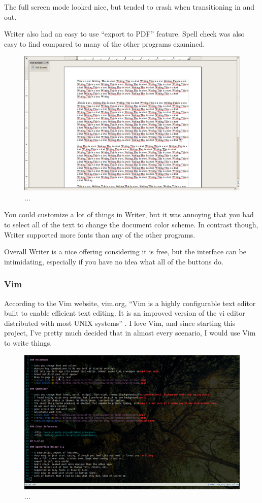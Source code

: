 \documentclass[10pt]{article}
\begin{document}
The full screen mode looked nice, but tended to crash when transitioning in and out.

Writer also had an easy to use ``export to PDF'' feature. Spell check was also easy to find compared to many of the other programs examined.

\begin{figure}
   \centering
      \includegraphics[width=130mm]{images/oo3.png}
   \caption{...}
\end{figure}

You could customize a lot of things in Writer, but it was annoying that you had to select all of the text to change the document color scheme. In contrast though, Writer supported more fonts than any of the other programs.

Overall Writer is a nice offering considering it is free, but the interface can be intimidating, especially if you have no idea what all of the buttons do.

\subsubsection{Vim}

According to the Vim website, vim.org, ``Vim is a highly configurable text editor built to enable efficient text editing. It is an improved version of the vi editor distributed with most UNIX systems'' \cite{vimabout}. I love Vim, and since starting this project, I've pretty much decided that in almost every scenario, I would use Vim to write things.

\begin{figure}
   \centering
      \includegraphics[width=130mm]{images/vim2.png}
   \caption{...}
\end{figure}
\end{document}
